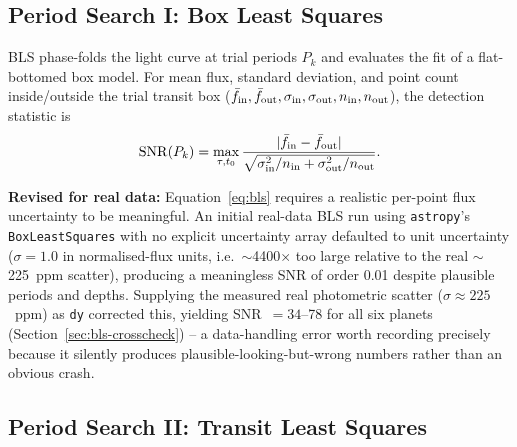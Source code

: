 \documentclass[11pt]{article}
\begin{document}
\subsection{Period Search I: Box Least Squares}

BLS \citep{Kovacs2002} phase-folds the light curve at trial periods $P_k$ and evaluates the fit of a flat-bottomed box model. For mean flux, standard deviation, and point count inside/outside the trial transit box ($\bar f_{\rm in}, \bar f_{\rm out}, \sigma_{\rm in}, \sigma_{\rm out}, n_{\rm in}, n_{\rm out}$), the detection statistic is
\begin{equation}
{\rm SNR}(P_k) = \max_{\tau,t_0} \frac{|\bar f_{\rm in} - \bar f_{\rm out}|}{\sqrt{\sigma_{\rm in}^2/n_{\rm in} + \sigma_{\rm out}^2/n_{\rm out}}}.
\label{eq:bls}
\end{equation}

\textbf{Revised for real data:} Equation~\ref{eq:bls} requires a realistic per-point flux uncertainty to be meaningful. An initial real-data BLS run using \texttt{astropy}'s \texttt{BoxLeastSquares} with no explicit uncertainty array defaulted to unit uncertainty ($\sigma=1.0$ in normalised-flux units, i.e.\ $\sim$4400$\times$ too large relative to the real $\sim$225~ppm scatter), producing a meaningless SNR of order 0.01 despite plausible periods and depths. Supplying the measured real photometric scatter ($\sigma \approx 225$~ppm) as \texttt{dy} corrected this, yielding SNR~$= 34$--78 for all six planets (Section~\ref{sec:bls-crosscheck}) -- a data-handling error worth recording precisely because it silently produces plausible-looking-but-wrong numbers rather than an obvious crash.

\subsection{Period Search II: Transit Least Squares}
\end{document}
